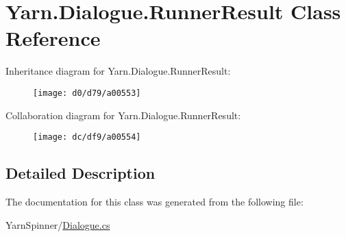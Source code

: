 \hypertarget{a00130}{\section{Yarn.\-Dialogue.\-Runner\-Result Class Reference}
\label{a00130}
}


Inheritance diagram for Yarn.\-Dialogue.\-Runner\-Result\-:
\nopagebreak
\begin{figure}[H]
\begin{center}
\leavevmode
\texttt{[image: d0/d79/a00553]}
\end{center}
\end{figure}


Collaboration diagram for Yarn.\-Dialogue.\-Runner\-Result\-:
\nopagebreak
\begin{figure}[H]
\begin{center}
\leavevmode
\texttt{[image: dc/df9/a00554]}
\end{center}
\end{figure}


\subsection{Detailed Description}


The documentation for this class was generated from the following file\-:\begin{DoxyCompactItemize}
\item 
Yarn\-Spinner/\hyperlink{a00262}{Dialogue.\-cs}\end{DoxyCompactItemize}
